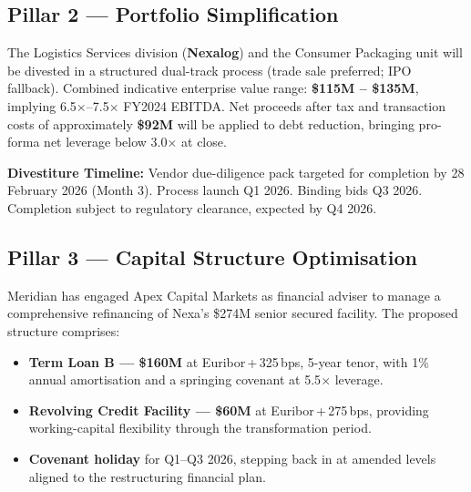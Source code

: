 \documentclass[11pt,a4paper]{article}
\begin{document}
\vspace{10pt}

\subsection{Pillar 2 — Portfolio Simplification}

The Logistics Services division (\textbf{Nexalog}) and the Consumer Packaging unit will be
divested in a structured dual-track process (trade sale preferred; IPO fallback).
Combined indicative enterprise value range: \textbf{\$115M -- \$135M}, implying 6.5$\times$--7.5$\times$
FY2024 EBITDA. Net proceeds after tax and transaction costs of approximately \textbf{\$92M}
will be applied to debt reduction, bringing pro-forma net leverage below 3.0$\times$ at close.

\vspace{6pt}
\begin{tcolorbox}[goldbox]
\small
\textbf{Divestiture Timeline:} Vendor due-diligence pack targeted for completion by
28 February 2026 (Month 3). Process launch Q1 2026. Binding bids Q3 2026. Completion
subject to regulatory clearance, expected by Q4 2026.
\end{tcolorbox}

\vspace{10pt}

\subsection{Pillar 3 — Capital Structure Optimisation}

\begin{tcolorbox}[execbox={Debt Refinancing \& Covenant Reset}]
\small
Meridian has engaged Apex Capital Markets as financial adviser to manage a comprehensive
refinancing of Nexa's \$274M senior secured facility. The proposed structure comprises:
\begin{itemize}[leftmargin=1.2em,itemsep=2pt,topsep=4pt]
  \item \textbf{Term Loan B — \$160M} at Euribor\,+\,325\,bps, 5-year tenor, with 1\% annual
    amortisation and a springing covenant at 5.5$\times$ leverage.
  \item \textbf{Revolving Credit Facility — \$60M} at Euribor\,+\,275\,bps, providing
    working-capital flexibility through the transformation period.
  \item \textbf{Covenant holiday} for Q1–Q3 2026, stepping back in at amended levels aligned
    to the restructuring financial plan.
\end{itemize}
\end{tcolorbox}
\end{document}
